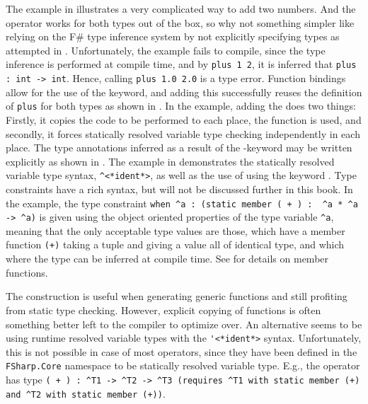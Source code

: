 The example in  illustrates a very complicated way to add two numbers. And the \lexeme{+} operator works for both types out of the box, so why not something simpler like relying on the F\# type inference system by not explicitly specifying types as attempted in .
%
%
Unfortunately, the example fails to compile, since the type inference is performed at compile time, and by \lstinline{plus 1 2}, it is inferred that \lstinline{plus : int -> int}. Hence, calling \lstinline{plus 1.0 2.0} is a type error. Function bindings allow for the use of the  keyword, and adding this successfully reuses the definition of \lstinline{plus} for both types as shown in .
%
%
In the example, adding the  does two things: Firstly, it copies the code to be performed to each place, the function is used, and secondly, it forces statically resolved variable type checking independently in each place. The type annotations inferred as a result of the -keyword may be written explicitly as shown in .
%
%
The example in  demonstrates the statically resolved variable type syntax, \lstinline[language=syntax]{^<*ident*>}, as well as the use of  using the keyword .  Type constraints have a rich syntax, but will not be discussed further in this book. In the example, the type constraint \lstinline{when ^a : (static member ( + ) :  ^a * ^a -> ^a)} is given using the object oriented properties of the type variable \lstinline{^a}, meaning that the only acceptable type values are those, which have a member function \lstinline{(+)} taking a tuple and giving a value all of identical type, and which where the type can be inferred at compile time. See  for details on member functions.

The  construction is useful when generating generic functions and still profiting from static type checking. However, explicit copying of functions is often something better left to the compiler to optimize over. An alternative seems to be using runtime resolved variable types with the \lstinline[language=syntax]{'<*ident*>} syntax. Unfortunately, this is not possible in case of most operators, since they have been defined in the \lstinline{FSharp.Core} namespace to be statically resolved variable type. E.g., the \lexeme{+} operator has type \lstinline{( + ) : ^T1 -> ^T2 -> ^T3 (requires ^T1 with static member (+) and ^T2 with static member (+))}.


